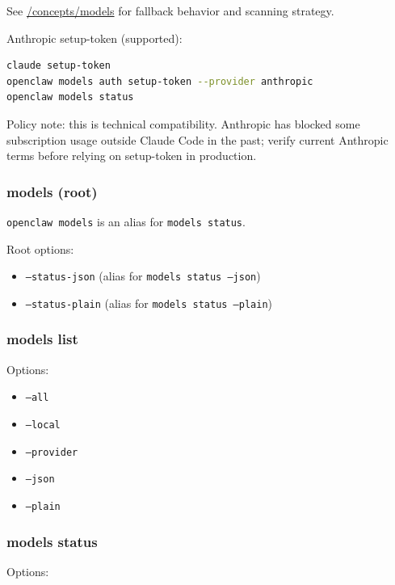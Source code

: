 See \href{/concepts/models}{/concepts/models} for fallback behavior and scanning strategy.

Anthropic setup-token (supported):

\begin{lstlisting}[language=bash]
claude setup-token
openclaw models auth setup-token --provider anthropic
openclaw models status
\end{lstlisting}


Policy note: this is technical compatibility. Anthropic has blocked some
subscription usage outside Claude Code in the past; verify current Anthropic
terms before relying on setup-token in production.

\subsubsection{models (root)}


\texttt{openclaw models} is an alias for \texttt{models status}.

Root options:

\begin{itemize}
  \item \texttt{--status-json} (alias for \texttt{models status --json})
  \item \texttt{--status-plain} (alias for \texttt{models status --plain})
\end{itemize}


\subsubsection{models list}


Options:

\begin{itemize}
  \item \texttt{--all}
  \item \texttt{--local}
  \item \texttt{--provider }
  \item \texttt{--json}
  \item \texttt{--plain}
\end{itemize}


\subsubsection{models status}


Options:


